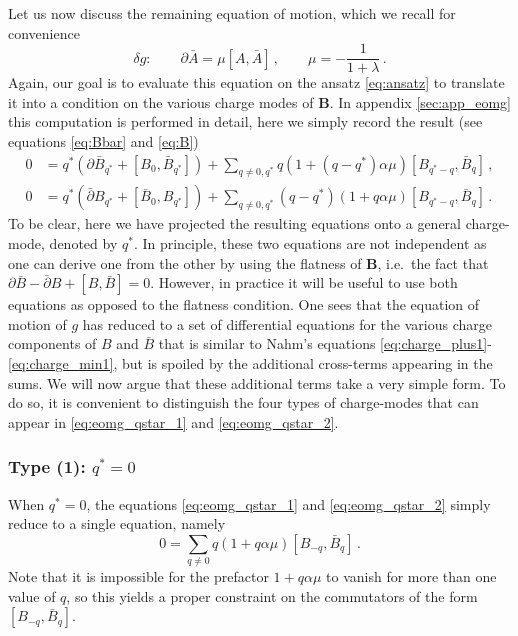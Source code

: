 \documentclass[11pt,a4paper]{article}
\numberwithin{equation}{section}
\numberwithin{table}{section}\setlength{\multlinegap}{25pt}
\begin{document}
Let us now discuss the remaining equation of motion, which we recall for convenience
\begin{equation}
	\delta g:\qquad \partial\bar{A} = \mu[A,\bar{A}]\,,\qquad \mu = -\frac{1}{1+\lambda}\,.
\end{equation}
Again, our goal is to evaluate this equation on the ansatz \eqref{eq:ansatz} to translate it into a condition on the various charge modes of $\mathbf{B}$. In appendix \ref{sec:app_eomg} this computation is performed in detail, here we simply record the result (see equations \eqref{eq:Bbar} and \eqref{eq:B})
\begin{align}
\label{eq:eomg_qstar_1}	0&=q^*\left(\partial\bar{B}_{q^*}+[B_0,\bar{B}_{q^*}]\right) + \sum_{q\neq 0,q^*}q (1+(q-q^*)\alpha\mu)[B_{q^*-q}, \bar{B}_{q}]\,,\\
\label{eq:eomg_qstar_2}	0&=q^*\left(\bar{\partial}B_{q^*}+[\bar{B}_0,B_{q^*}]\right)+\sum_{q\neq 0,q^*}(q-q^*)(1+q\alpha\mu)[B_{q^*-q}, \bar{B}_{q}]\,.
\end{align}
To be clear, here we have projected the resulting equations onto a general charge-mode, denoted by $q^*$. In principle, these two equations are not independent as one can derive one from the other by using the flatness of $\mathbf{B}$, i.e.~the fact that $\partial\bar{B}-\bar{\partial}B+[B,\bar{B}]=0$. However, in practice it will be useful to use both equations as opposed to the flatness condition. One sees that the equation of motion of $g$ has reduced to a set of differential equations for the various charge components of $B$ and $\bar{B}$ that is similar to Nahm's equations \eqref{eq:charge_plus1}-\eqref{eq:charge_min1}, but is spoiled by the additional cross-terms appearing in the sums. We will now argue that these additional terms take a very simple form. To do so, it is convenient to distinguish the four types of charge-modes that can appear in \eqref{eq:eomg_qstar_1} and \eqref{eq:eomg_qstar_2}.

\subsubsection*{Type (1): $q^*=0$}

When $q^*=0$, the equations \eqref{eq:eomg_qstar_1} and \eqref{eq:eomg_qstar_2} simply reduce to a single equation, namely
\begin{equation}
	0 =\sum_{q\neq 0} q(1+q\alpha\mu)[B_{-q},\bar{B}_{q}]\,.
\end{equation}
Note that it is impossible for the prefactor $1+q\alpha\mu$ to vanish for more than one value of $q$, so this yields a proper constraint on the commutators of the form $[B_{-q},\bar{B}_q]$. 
\end{document}
